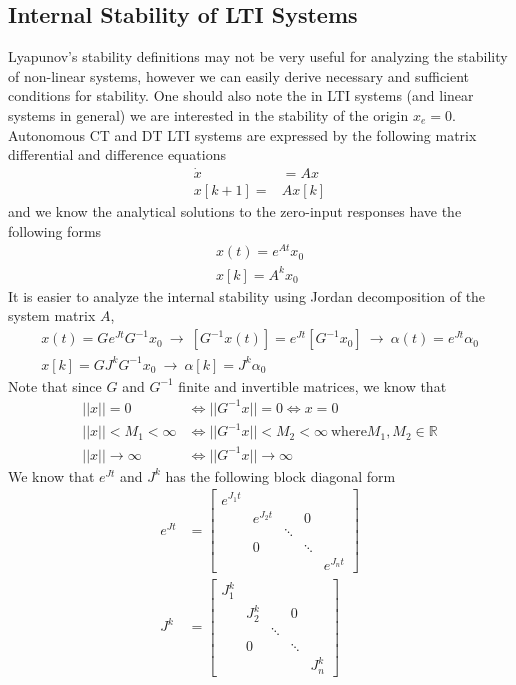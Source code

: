 \documentclass[twoside]{article}
\begin{document}
\subsection{Internal Stability of LTI Systems}

Lyapunov's stability definitions may not be very useful for analyzing
the stability of non-linear systems, however we can easily derive
necessary and sufficient conditions for stability. One should also note the 
in LTI systems (and linear systems in general) we are interested in the
stability of the origin $x_e = 0$. Autonomous CT and DT LTI systems are expressed 
by the following matrix differential and difference equations
%
\begin{align*}
\dot{x} &= A x 
\\
x[k+1] =& A x[k]
\end{align*}
%
and we know the analytical solutions to the zero-input responses have the following forms
%
\begin{align*}
x(t) = e^{A t} x_0
\\
x[k] = A^k x_0
\end{align*}
%
It is easier to analyze the internal stability using Jordan decomposition of the system matrix $A$, 
%
\begin{align*}
x(t) = G e^{J t} G^{-1} x_0 \ \rightarrow \  \left[ G^{-1} x(t) \right] = e^{J t} \left[ G^{-1} x_0 \right] \ \rightarrow \ \alpha(t) = e^{J t} \alpha_0
\\
x[k] = G J^k G^{-1} x_0  \ \rightarrow \ \alpha[k] = J^k \alpha_0
\end{align*}
%
Note that since $G$ and $G^{-1}$ finite and invertible matrices, we know that 
%
\begin{align*}
|| x || = 0 &\iff || G^{-1} x || = 0 \iff x = 0 
\\
|| x || < M_1 < \infty &\iff || G^{-1} x || < M_2 < \infty \ \mathrm{where} M_1 , M_2 \in \mathbb{R}
\\
|| x || \to \infty &\iff || G^{-1} x || \to \infty 
\end{align*}
%
We know that $e^{J t}$ and $J^k$ has the following block diagonal form
%
\begin{align*}
e^{J t} &= \left[ \begin{array}{ccccc} e^{J_1 t} &  & & &  \\  & e^{J_2 t}  &  & 0 &  \\ &  & \ddots & \\ & 0 & & \ddots & \\ & &  & &  e^{J_n t}  \end{array} \right]
\\
J^k &= \left[ \begin{array}{ccccc} J_1^k &  & & &  \\  & J_2^k  &  & 0 &  \\ &  & \ddots & \\ & 0 & & \ddots & \\ & &  & &  J_n^k  \end{array} \right]
\end{align*}
\end{document}
